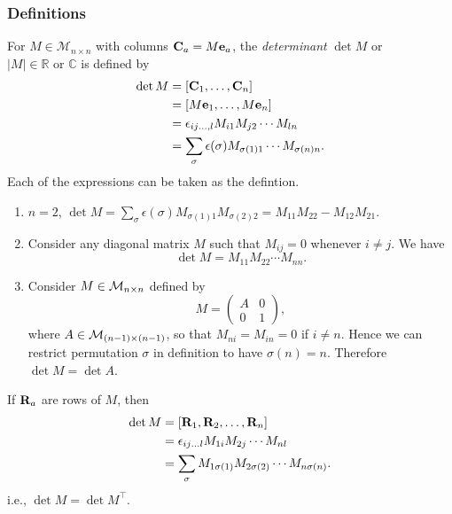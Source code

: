 \documentclass[10pt]{article}
\begin{document}
    \subsubsection{Definitions}
    \begin{definition}
        For $ M\in \mathcal{M}_{n\times n} $ with columns $ {\bf C}_a=M{\bf e}_a $, the \textit{determinant} $ \det M $ or $ |M|\in \mathbb{R} \text{ or }\mathbb{C}  $ is defined by 
    \[
        \begin{aligned}
            \det M&= [{\bf C}_1,\dots,{\bf C}_n]\\
             &=[M{\bf e}_1,\dots,M{\bf e}_n]\\
             &= \epsilon_{ij\dots,l}M_{i1}M_{j2}\cdots M_{ln}\\
             &= \sum_{\sigma}\epsilon(\sigma)M_{\sigma(1)1}\cdots M_{\sigma(n)n}.
        \end{aligned}
    \]
    Each of the expressions can be taken as the defintion.
    \end{definition}
    \begin{example}
        \begin{enumerate}
            \item $n=2$, $ \det M= \sum_{\sigma}\epsilon(\sigma)M_{\sigma(1)1}M_{\sigma(2)2}=M_{11}M_{22}-M_{12}M_{21} $.
            \item Consider any diagonal matrix $M$ such that $ M_{ij}=0 $ whenever $ i\neq j $. We have 
            \[
                \det M = M_{11}M_{22}\cdots M_{nn}
            .\]
            \item Consider $ M\in {\mathcal{M}}_{n\times n} $ defined by 
            \[
                M= \begin{pmatrix}
                    A&0\\
                    0&1
                \end{pmatrix}
            ,\]
            where $A\in {\mathcal{M}}_{(n-1) \times (n-1)}$, so that $ M_{ni}=M_{in}=0 $ if $i\neq n$. Hence we can restrict permutation $ \sigma $ in definition to have $ \sigma(n)=n $. Therefore $ \det M=\det A $.
        \end{enumerate}
    \end{example}
    \begin{proposition}
        If $ {\bf R}_a $ are rows of $M$, then 
        \[
            \begin{aligned}
                \det M&=[{\bf R}_1,{\bf R}_2,\dots,{\bf R}_n]\\
                &= \epsilon_{ij\dots l}M_{1i}M_{2j}\cdots M_{nl}\\
                &= \sum_{\sigma}M_{1\sigma(1)}M_{2\sigma(2)}\cdots M_{n\sigma(n)}.
            \end{aligned}
        \]
        i.e., $ \det M = \det M^{\top} $.
    \end{proposition}
\end{document}
